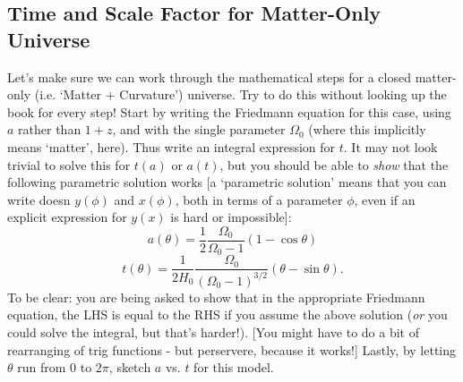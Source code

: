 \subsection*{Time and Scale Factor for Matter-Only Universe}
\begin{tcolorbox}
Let's make sure we can work through the mathematical steps for a closed matter-only (i.e. `Matter + Curvature') universe. Try to do this without looking up the book for every step! Start by writing the Friedmann equation for this case, using $a$ rather than $1+z$, and with the single parameter $\Omega_0$ (where this implicitly means `matter', here). Thus write an integral expression for $t$. It may not look trivial to solve this for $t(a)$ or $a(t)$, but you should be able to \emph{show} that the following parametric solution works [a `parametric solution' means that you can write doesn $y(\phi)$ and $x(\phi)$, both in terms of a parameter $\phi$, even if an explicit expression for $y(x)$ is hard or impossible]:
\begin{equation}\label{parametric_a}
    a(\theta) = \frac{1}{2}\frac{\Omega_0}{\Omega_0 - 1}(1-\cos\theta)
\end{equation}
\begin{equation}\label{parametric_t}
    t(\theta) = \frac{1}{2H_0}\frac{\Omega_0}{(\Omega_0 - 1)^{3/2}}(\theta - \sin\theta).
\end{equation}
To be clear: you are being asked to show that in the appropriate Friedmann equation, the LHS is equal to the RHS if you assume the above solution (\emph{or} you could solve the integral, but that's harder!). [You might have to do a bit of rearranging of trig functions - but perservere, because it works!] Lastly, by letting $\theta$ run from $0$ to $2\pi$, sketch $a$ vs. $t$ for this model. 
\end{tcolorbox}

